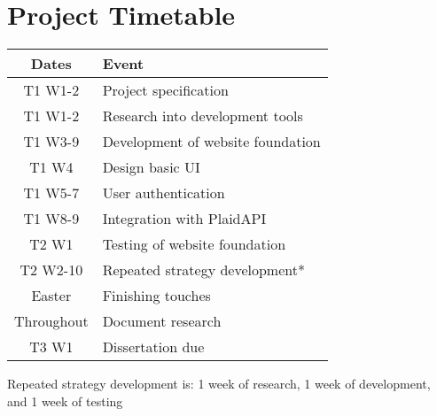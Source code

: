 
\section{Project Timetable}

\begin{center}
	\begin{tabular}{ | c | l | }
		\hline
		\textbf{Dates} & \textbf{Event} \\ \hline
		T1 W1-2 & Project specification \\ \hline
		T1 W1-2 & Research into development tools \\ \hline
		T1 W3-9 & Development of website foundation \\ \hline
		T1 W4 & Design basic UI \\ \hline
		T1 W5-7 & User authentication \\ \hline
		T1 W8-9 & Integration with PlaidAPI \\ \hline
		T2 W1 & Testing of website foundation \\ \hline
		T2 W2-10 & Repeated strategy development* \\ \hline
		Easter & Finishing touches \\ \hline
		Throughout & Document research \\ \hline
		T3 W1 & Dissertation due \\ \hline
	\end{tabular}
\end{center}

\small *Repeated strategy development is: 1 week of research, 1 week of development, and 1 week of testing

 


 

